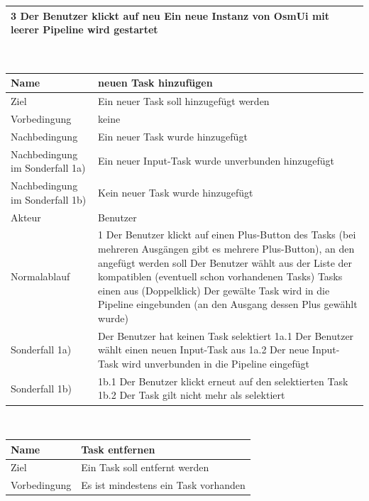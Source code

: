 \documentclass[a4paper,12pt]{scrartcl}
\begin{document}
\begin{center}
\begin{tabular}{|p{5cm}|p{10cm}|}
3 Der Benutzer klickt auf neu
\newline
4 Ein neue Instanz von OsmUi mit leerer Pipeline wird gestartet\\ 
\hline 
\end{tabular} 
\vspace{0.7cm}
\\
\begin{tabular}{|p{5cm}|p{10cm}|}
\hline Name & \textbf{neuen Task hinzufügen} \\ 
\hline Ziel & Ein neuer Task soll hinzugefügt werden \\ 
\hline Vorbedingung& keine \\
\hline Nachbedingung & Ein neuer Task wurde hinzugefügt \\ 
\hline Nachbedingung im Sonderfall 1a) & Ein neuer Input-Task wurde unverbunden hinzugefügt\\
\hline Nachbedingung im Sonderfall 1b) & Kein neuer Task wurde hinzugefügt\\
\hline Akteur & Benutzer \\ 
\hline Normalablauf & 1 Der Benutzer klickt auf einen Plus-Button des Tasks (bei mehreren Ausgängen gibt es mehrere Plus-Button), an den angefügt werden soll
\newline 2 Der Benutzer wählt aus der Liste der kompatiblen (eventuell schon vorhandenen Tasks) Tasks einen aus (Doppelklick)
\newline 3 Der gewälte Task wird in die Pipeline eingebunden (an den Ausgang dessen Plus gewählt wurde)\\ 
\hline Sonderfall 1a) & Der Benutzer hat keinen Task selektiert
\newline 1a.1 Der Benutzer wählt einen neuen Input-Task aus
\newline 1a.2 Der neue Input-Task wird unverbunden in die Pipeline eingefügt\\
\hline Sonderfall 1b) & 1b.1 Der Benutzer klickt erneut auf den selektierten Task
\newline 1b.2 Der Task gilt nicht mehr als selektiert\\
\hline
\end{tabular}
\vspace{0.7cm}
\\
\begin{tabular}{|p{5cm}|p{10cm}|}
\hline Name & \textbf{Task entfernen} \\ 
\hline Ziel & Ein Task soll entfernt werden \\ 
\hline Vorbedingung & Es ist mindestens ein Task vorhanden \\ 

\end{tabular}
\end{center}
\end{document}
